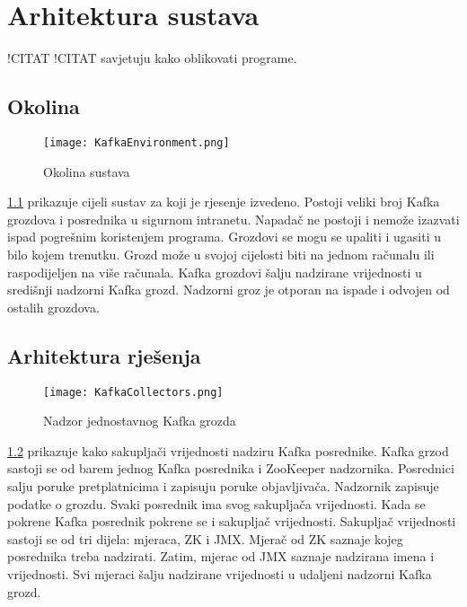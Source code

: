 \documentclass[times, utf8, diplomski, numeric]{fer}
\begin{document}
\chapter{Arhitektura sustava}

!CITAT !CITAT savjetuju kako oblikovati programe. 

\section{Okolina}

\begin{figure}[H]
    \centering
    \texttt{[image: KafkaEnvironment.png]}
    \caption{Okolina sustava}
    \label{fig:kafka-environment}
\end{figure}

\ref{fig:kafka-environment} prikazuje cijeli sustav za koji je rjesenje izvedeno. Postoji veliki broj Kafka grozdova i posrednika u sigurnom intranetu. Napadač ne postoji i nemože izazvati ispad pogrešnim koristenjem programa. Grozdovi se mogu se upaliti i ugasiti u bilo kojem trenutku. Grozd može u svojoj cijelosti biti na jednom računalu ili raspodijeljen na više računala. Kafka grozdovi šalju nadzirane vrijednosti u središnji nadzorni Kafka grozd. Nadzorni groz je otporan na ispade i odvojen od ostalih grozdova.

\section{Arhitektura rješenja}

\begin{figure}[H]
    \centering
    \texttt{[image: KafkaCollectors.png]}
    \caption{Nadzor jednostavnog Kafka grozda}
    \label{fig:collectors}
\end{figure}

\ref{fig:collectors} prikazuje kako sakupljači vrijednosti nadziru Kafka posrednike. Kafka grzod sastoji se od barem jednog Kafka posrednika i ZooKeeper nadzornika. Posrednici salju poruke pretplatnicima i zapisuju poruke objavljivača. Nadzornik zapisuje podatke o grozdu. Svaki posrednik ima svog sakupljača vrijednosti. Kada se pokrene Kafka posrednik pokrene se i sakupljač vrijednosti. Sakupljač vrijednosti sastoji se od tri dijela: mjeraca, ZK i JMX. Mjerač od ZK saznaje kojeg posrednika treba nadzirati. Zatim, mjerac od JMX saznaje nadzirana imena i vrijednosti. Svi mjeraci šalju nadzirane vrijednosti u udaljeni nadzorni Kafka grozd.
\end{document}
